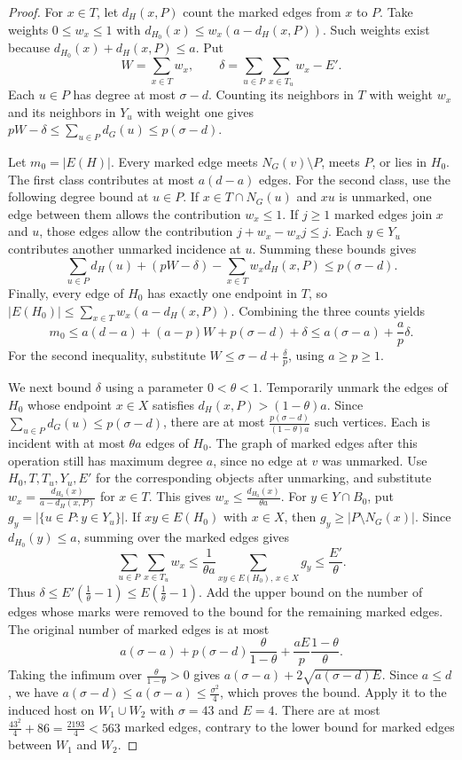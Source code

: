 \documentclass[preprint,11pt,numbers]{elsarticle-arxiv}
\numberwithin{equation}{section}
\theoremstyle{definition}
\begin{document}
\begin{proof}
For $x\in T$, let $d_H(x,P)$ count the marked edges from $x$ to $P$.
Take weights $0\leq w_x\leq1$ with
$d_{H_0}(x)\leq w_x(a-d_H(x,P))$. Such weights exist because
$d_{H_0}(x)+d_H(x,P)\leq a$. Put
\[
 W=\sum_{x\in T}w_x,\qquad
 \delta=\sum_{u\in P}\sum_{x\in T_u}w_x-E'.
\]
Each $u\in P$ has degree at most $\sigma-d$. Counting its
neighbors in $T$ with weight $w_x$ and its neighbors in $Y_u$
with weight one gives
$pW-\delta\leq\sum_{u\in P}d_G(u)\leq p(\sigma-d)$.

Let $m_0=|E(H)|$. Every marked edge meets $N_G(v)\setminus P$,
meets $P$, or lies in $H_0$. The first class contributes at most
$a(d-a)$ edges. For the second class, use the following degree
bound at $u\in P$. If $x\in T\cap N_G(u)$ and $xu$ is unmarked,
one edge between them allows the contribution $w_x\leq1$.
If $j\geq1$ marked edges join $x$ and $u$, those edges allow the
contribution $j+w_x-w_xj\leq j$.
Each $y\in Y_u$ contributes another unmarked incidence at $u$.
Summing these bounds gives
\[
 \sum_{u\in P}d_H(u)+(pW-\delta)-\sum_{x\in T}w_xd_H(x,P)
 \leq p(\sigma-d).
\]
Finally, every edge of $H_0$ has exactly one endpoint in $T$, so
$|E(H_0)|\leq\sum_{x\in T}w_x(a-d_H(x,P))$.
Combining the three counts yields
\[
 m_0\leq a(d-a)+(a-p)W+p(\sigma-d)+\delta
 \leq a(\sigma-a)+\frac{a}{p}\delta.
\]
For the second inequality, substitute
$W\leq\sigma-d+\frac{\delta}{p}$, using $a\geq p\geq1$.

We next bound $\delta$ using a parameter $0<\theta<1$. Temporarily
unmark the edges of $H_0$ whose endpoint $x\in X$ satisfies
$d_H(x,P)>(1-\theta)a$. Since $\sum_{u\in P}d_G(u)\leq
p(\sigma-d)$, there are at most $\frac{p(\sigma-d)}{(1-\theta)a}$
such vertices. Each is incident with at most $\theta a$ edges
of $H_0$. The graph of marked edges after this operation still
has maximum degree $a$, since no edge at $v$ was unmarked.
Use $H_0,T,T_u,Y_u,E'$ for the corresponding objects after
unmarking, and substitute
$w_x=\frac{d_{H_0}(x)}{a-d_H(x,P)}$ for $x\in T$. This gives
$w_x\leq\frac{d_{H_0}(x)}{\theta a}$. For $y\in Y\cap B_0$, put
$g_y=|\{u\in P:y\in Y_u\}|$. If $xy\in E(H_0)$ with $x\in X$,
then $g_y\geq|P\setminus N_G(x)|$. Since $d_{H_0}(y)\leq a$,
summing over the marked edges gives
\[
 \sum_{u\in P}\sum_{x\in T_u}w_x
 \leq\frac{1}{\theta a}\sum_{xy\in E(H_0),\,x\in X}g_y
 \leq\frac{E'}{\theta}.
\]
Thus $\delta\leq E'(\frac{1}{\theta}-1)\leq E(\frac{1}{\theta}-1)$.
Add the upper bound on the number of edges whose marks were removed
to the bound for the remaining marked edges. The original number of
marked edges is at most
\[
 a(\sigma-a)+p(\sigma-d)\frac{\theta}{1-\theta}
              +\frac{aE}{p}\frac{1-\theta}{\theta}.
\]
Taking the infimum over $\frac{\theta}{1-\theta}>0$ gives
$a(\sigma-a)+2\sqrt{a(\sigma-d)E}$. Since $a\leq d$,
we have $a(\sigma-d)\leq a(\sigma-a)\leq\frac{\sigma^2}{4}$,
which proves the bound. Apply it to the induced host on
$W_1\cup W_2$ with $\sigma=43$ and $E=4$. There are at most
$\frac{43^2}{4}+86=\frac{2193}{4}<563$ marked edges, contrary
to the lower bound for marked edges between $W_1$ and $W_2$.
\end{proof}
\end{document}
